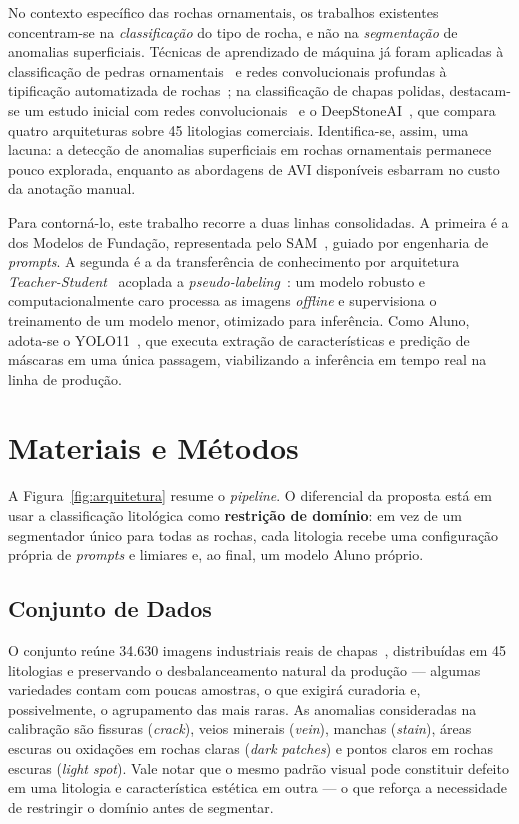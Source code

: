 \documentclass[10pt,conference]{IEEEtran}
\begin{document}
No contexto específico das rochas ornamentais, os trabalhos existentes concentram-se na \textit{classificação} do tipo de rocha, e não na \textit{segmentação} de anomalias superficiais. Técnicas de aprendizado de máquina já foram aplicadas à classificação de pedras ornamentais~\cite{stone_lopez2010} e redes convolucionais profundas à tipificação automatizada de rochas~\cite{rocktyping_baraboshkin2020}; na classificação de chapas polidas, destacam-se um estudo inicial com redes convolucionais~\cite{deepstone_araujo2022} e o DeepStoneAI~\cite{deepstoneai_moreira2025}, que compara quatro arquiteturas sobre 45 litologias comerciais. Identifica-se, assim, uma lacuna: a detecção de anomalias superficiais em rochas ornamentais permanece pouco explorada, enquanto as abordagens de AVI disponíveis esbarram no custo da anotação manual.

Para contorná-lo, este trabalho recorre a duas linhas consolidadas. A primeira é a dos Modelos de Fundação, representada pelo SAM~\cite{sam_kirillov2023}, guiado por engenharia de \textit{prompts}. A segunda é a da transferência de conhecimento por arquitetura \textit{Teacher-Student}~\cite{distill_hinton2015} acoplada a \textit{pseudo-labeling}~\cite{pseudolabel_lee2013}: um modelo robusto e computacionalmente caro processa as imagens \textit{offline} e supervisiona o treinamento de um modelo menor, otimizado para inferência. Como Aluno, adota-se o YOLO11~\cite{yolo11_khanam2024}, que executa extração de características e predição de máscaras em uma única passagem, viabilizando a inferência em tempo real na linha de produção.

\section{Materiais e Métodos}

A Figura~\ref{fig:arquitetura} resume o \textit{pipeline}. O diferencial da proposta está em usar a classificação litológica como \textbf{restrição de domínio}: em vez de um segmentador único para todas as rochas, cada litologia recebe uma configuração própria de \textit{prompts} e limiares e, ao final, um modelo Aluno próprio.

\subsection{Conjunto de Dados}

O conjunto reúne 34.630 imagens industriais reais de chapas~\cite{dataset_araujo2023}, distribuídas em 45 litologias e preservando o desbalanceamento natural da produção --- algumas variedades contam com poucas amostras, o que exigirá curadoria e, possivelmente, o agrupamento das mais raras. As anomalias consideradas na calibração são fissuras (\textit{crack}), veios minerais (\textit{vein}), manchas (\textit{stain}), áreas escuras ou oxidações em rochas claras (\textit{dark patches}) e pontos claros em rochas escuras (\textit{light spot}). Vale notar que o mesmo padrão visual pode constituir defeito em uma litologia e característica estética em outra --- o que reforça a necessidade de restringir o domínio antes de segmentar.
\end{document}
